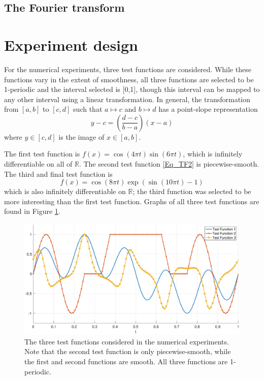 \documentclass[12pt]{article}
\newcommand{\fcon}{f}
\begin{document}
\subsection{The Fourier transform}

\section{Experiment design}

For the numerical experiments, three test functions are considered. While these functions vary in the extent of smoothness, all three functions are selected to be 1-periodic and the interval selected is [0,1], though this interval can be mapped to any other interval using a linear transformation. In general, the transformation from $[a,b]$ to $[c,d]$ such that $a \mapsto c$ and $b \mapsto d$ has a point-slope representation
\[y - c = \left(\frac{d-c}{b-a}\right)(x - a)\]
where $y \in [c,d]$ is the image of $x \in [a,b]$. \par
The first test function is $\fcon(x) = \cos(4\pi{t})\sin(6\pi{t})$, which is infinitely differentiable on all of $\mathbb{R}$. The second test function \eqref{Eq_TF2} is piecewise-smooth. The third and final test function is
\begin{equation}
\fcon(x) = \cos(8\pi{t})\exp(\sin(10\pi{t})-1)
\label{Eq_TF3}
\end{equation}
which is also infinitely differentiable on $\mathbb{R}$; the third function was selected to be more interesting than the first test function. Graphs of all three test functions are found in Figure \ref{TestFunctions}.  \par

\begin{figure}
	\centerline{\includegraphics[scale = 0.45]{Figures/TestFunctions1D.eps}}
\caption{The three test functions considered in the numerical experiments. Note that the second test function is only piecewise-smooth, while the first and second functions are smooth. All three functions are 1-periodic.}
\label{TestFunctions}
\end{figure}
\end{document}
